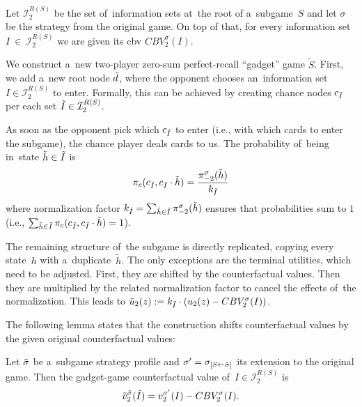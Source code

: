 Let $\mathcal{I}_2^{R(S)}$ be the set of~information sets at~the root of a~subgame~$S$ and let $\sigma$ be the strategy from the original game.
On top of that, for every information set~$I~\in~\mathcal{I}_2^{R(S)}$ we are given its \acrlong{cbv} $CBV_2^{\sigma}(I)$.

We construct a~new two-player zero-sum perfect-recall ``gadget'' game $\tilde{S}$.
First, we add a~new root node $\tilde{d}$, where the opponent chooses an~information set $I \in \mathcal{I}_2^{R(S)}$ to enter.
Formally, this can be achieved by creating chance nodes $c_{\tilde{I}}$ per each set $\tilde{I} \in \mathcal{I}_2^{R(S)}$.

As soon as the opponent pick which $c_{\tilde{I}}$ to enter (i.e., with which cards to enter the subgame), the chance player deals cards to us.
The probability of~being in~state $\tilde{h}\in \tilde{I}$ is
\[
  \pi_c (c_{\tilde{I}}, c_{\tilde{I}} \cdot \tilde{h}) = \frac {\pi_{-2} ^{\sigma}(\tilde{h})} {k_{\tilde{I}}}
\]
where normalization factor $k_{\tilde{I}} = \sum_{ \tilde{h} \in \tilde{I}} \pi_{-2}^\sigma(\tilde{h})$ ensures that probabilities sum to $1$ (i.e., $\sum_{\tilde{h} \in \tilde{I}} \pi_c (c_{\tilde{I}}, c_{\tilde{I}} \cdot \tilde{h}) = 1$).

The remaining structure of~the subgame is directly replicated, copying every state~$h$ with a~duplicate~$\tilde{h}$.
The only exceptions are the terminal utilities, which need to be adjusted.
First, they are shifted by the counterfactual values.
Then they are multiplied by the related normalization factor to cancel the effects of~the normalization.
This leads to $\tilde{u}_2(z) := k_{\tilde{I}} \cdot \left(u_2(z) - CBV_2^\sigma(I)\right)$.

The following lemma states that the construction shifts counterfactual values by the given original counterfactual values:
\begin{lem}
  \label{lem:cfv-shift}
  Let ${\tilde{\sigma}}$ be a~subgame strategy profile and $\sigma' = \sigma_{[S \leftarrow {\tilde{\sigma}}]}$ its extension to the original game.
  Then the gadget-game counterfactual value of~$I\in\mathcal{I}_2^{R(S)}$ is
  \[
    \tilde{v}_2 ^{\tilde{\sigma}}(\tilde{I}) = v_2 ^{\sigma'}(I) - CBV_2^\sigma(I).
  \]
\end{lem}

